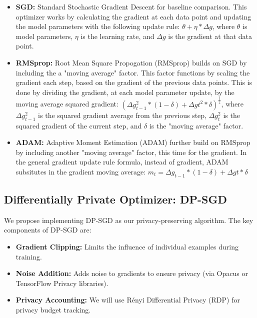 \documentclass{article}
\begin{document}
    \begin{itemize}
        \item \textbf{SGD:} Standard Stochastic Gradient Descent for baseline comparison. This optimizer works by calculating the gradient at each data 
        point and updating the model parameters with the following update rule: $\theta + \eta * \Delta g$, where $\theta$ is model parameters, $\eta$ is 
        the learning rate, and $\Delta g$ is the gradient at that data point.
        \item \textbf{RMSprop:} Root Mean Square Propogation (RMSprop) builds on SGD by including the a "moving average" factor. This factor functions by scaling the gradient
        each step, based on the gradient of the previous data points. This is done by dividing the gradient, at each model parameter update, 
        by the moving average squared gradient: $(\Delta g_{t-1}^{2} * (1-\delta) + \Delta g{t}^{2}*\delta)^{\frac{1}{2}}$,
        where $\Delta g_{t-1}^{2}$ is the squared gradient average from the previous step, $\Delta g_{t}^{2}$ is the squared gradient of the current step, and $\delta$ is the "moving average" factor. \cite{DBLP:journals/corr/abs-1807-06766} \cite{Jason_Huang_2020}
        \item \textbf{ADAM:} Adaptive Moment Estimation (ADAM) further build on RMSprop by including another "moving average" factor, this time for the gradient. In the general gradient update rule formula, instead of gradient,
        ADAM subsitutes in the gradient moving average: $m_{t} = \Delta g_{t-1} * (1-\delta) + \Delta g{t}*\delta$ \cite{DBLP:journals/corr/abs-1807-06766}
    \end{itemize}

    \subsection{Differentially Private Optimizer: DP-SGD}\label{subsec:differentially-private-optimizer:-dp-sgd}
    We propose implementing DP-SGD as our privacy-preserving algorithm.
    The key components of DP-SGD are:
    \begin{itemize}
        \item \textbf{Gradient Clipping:} Limits the influence of individual examples during training.
        \item \textbf{Noise Addition:} Adds noise to gradients to ensure privacy (via Opacus or TensorFlow Privacy libraries).
        \item \textbf{Privacy Accounting:} We will use Rényi Differential Privacy (RDP) for privacy budget tracking.
    \end{itemize}
\end{document}
